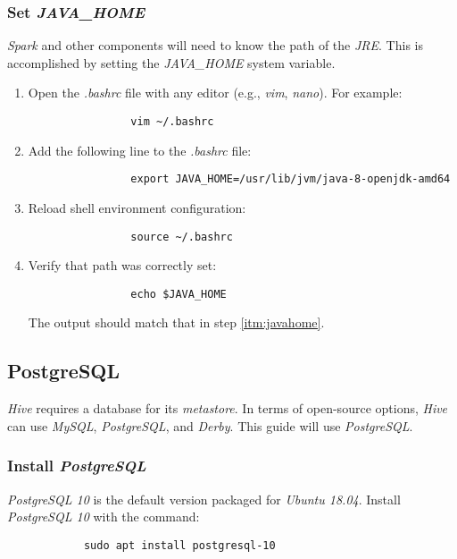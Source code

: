 \documentclass{article}
\begin{document}
        \subsubsection{Set \emph{JAVA\_HOME}}
        \label{subsec:javahome}
        \emph{Spark} and other components will need to know the path of the
        \emph{JRE}. This is accomplished by setting the \emph{JAVA\_HOME}
        system variable.

        \begin{enumerate}
            \item Open the \emph{.bashrc} file with any editor (e.g., \emph{vim}, \emph{nano}).
            For example:
            \begin{verbatim}
                vim ~/.bashrc
            \end{verbatim}
            
            \item Add the following line to the \emph{.bashrc} file:
            \label{itm:javahome}
            \begin{verbatim}
                export JAVA_HOME=/usr/lib/jvm/java-8-openjdk-amd64                 
            \end{verbatim}
            
            \item Reload shell environment configuration:
            \begin{verbatim}
                source ~/.bashrc
            \end{verbatim}
            
            \item Verify that path was correctly set:
            \begin{verbatim}
                echo $JAVA_HOME
            \end{verbatim}
            The output should match that in step \ref{itm:javahome}.
        \end{enumerate}

    \subsection{PostgreSQL}
    \label{subsec:postgres}
    \emph{Hive} requires a database for its \emph{metastore}. In terms of open-source options, \emph{Hive} can use
    \emph{MySQL}, \emph{PostgreSQL}, and \emph{Derby}. This guide will use \emph{PostgreSQL}.

        \subsubsection{Install \emph{PostgreSQL}}
        \emph{PostgreSQL 10} is the default version packaged for \emph{Ubuntu 18.04}. Install
        \emph{PostgreSQL 10} with the command:
        \begin{verbatim}
            sudo apt install postgresql-10
        \end{verbatim}
\end{document}
